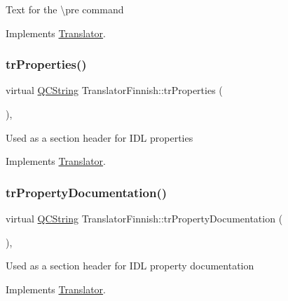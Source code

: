 Text for the \textbackslash{}pre command 

Implements \mbox{\hyperlink{class_translator}{Translator}}.

\mbox{\label{class_translator_finnish_afa5de6dc309de4844ecbbd25671ce0b9}} 
\subsubsection{\texorpdfstring{trProperties()}{trProperties()}}
{\footnotesize\ttfamily virtual \mbox{\hyperlink{class_q_c_string}{Q\+C\+String}} Translator\+Finnish\+::tr\+Properties (\begin{DoxyParamCaption}{ }\end{DoxyParamCaption})\hspace{0.3cm}{\ttfamily [inline]}, {\ttfamily [virtual]}}

Used as a section header for I\+DL properties 

Implements \mbox{\hyperlink{class_translator}{Translator}}.

\mbox{\label{class_translator_finnish_af3c94b48f43820d43a17af8c5fd143a2}} 
\subsubsection{\texorpdfstring{trPropertyDocumentation()}{trPropertyDocumentation()}}
{\footnotesize\ttfamily virtual \mbox{\hyperlink{class_q_c_string}{Q\+C\+String}} Translator\+Finnish\+::tr\+Property\+Documentation (\begin{DoxyParamCaption}{ }\end{DoxyParamCaption})\hspace{0.3cm}{\ttfamily [inline]}, {\ttfamily [virtual]}}

Used as a section header for I\+DL property documentation 

Implements \mbox{\hyperlink{class_translator}{Translator}}.

\mbox{\label{class_translator_finnish_a0145d54d5c536f40284790426689b0ba}} 
